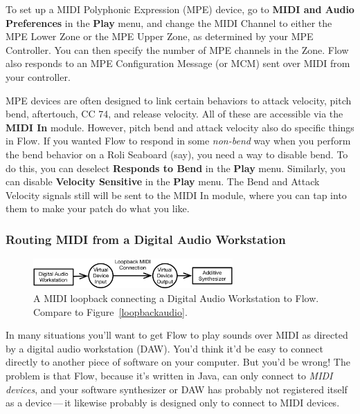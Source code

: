 \documentclass{article}
\newcommand\bump{\vspace{20in}}
\newcommand\name{Flow}
\begin{document}
To set up a MIDI Polyphonic Expression (MPE) device, go to {\bf MIDI and Audio Preferences} in the {\bf Play} menu, and change the MIDI Channel to either the MPE Lower Zone or the MPE Upper Zone, as determined by your MPE Controller.  You can then specify the number of MPE channels in the Zone.  {\name} also responds to an MPE Configuration Message (or MCM) sent over MIDI from your controller.

MPE devices are often designed to link certain behaviors to attack velocity, pitch bend, aftertouch, CC 74, and release velocity.  All of these are accessible via the {\bf MIDI In} module.  However, pitch bend and attack velocity also do specific things in Flow.  If you wanted Flow to respond in some {\it non-bend} way when you perform the bend behavior on a Roli Seaboard (say), you need a way to disable bend.  To do this, you can deselect {\bf Responds to Bend} in the {\bf Play} menu.  Similarly, you can disable {\bf Velocity Sensitive} in the {\bf Play} menu.  The Bend and Attack Velocity signals still will be sent to the MIDI In module, where you can tap into them to make your patch do what you like.

\bump

\subsubsection{Routing MIDI from a Digital Audio Workstation}
\label{routingmidi}

\begin{figure}
\begin{center}\vspace{-1em}\includegraphics[width=3in]{loopbackmidi}\end{center}
\vspace{-1em}
\caption{A MIDI loopback connecting a Digital Audio Workstation to {\name}.  Compare to Figure~\ref{loopbackaudio}.}\label{loopbackmidi}
\end{figure}

In many situations you'll want to get {\name} to play sounds over MIDI  as directed by a digital audio workstation (DAW).   You'd think it'd be easy to connect directly to another piece of software on your computer.  But you'd be wrong!  The problem is that {\name}, because it's written in Java, can only connect to {\it MIDI devices}, and your software synthesizer or DAW has probably not registered itself as a device\,---\,it likewise probably is designed only to connect to MIDI devices.
\end{document}
